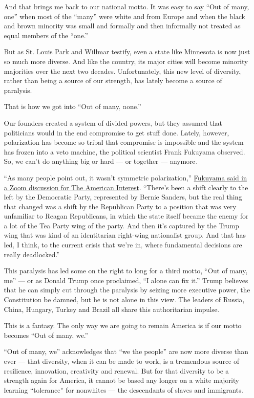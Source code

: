 And that brings me back to our national motto. It was easy to say ``Out
of many, one'' when most of the ``many'' were white and from Europe and
when the black and brown minority was small and formally and then
informally not treated as equal members of the ``one.''

But as St. Louis Park and Willmar testify, even a state like Minnesota
is now just so much more diverse. And like the country, its major cities
will become minority majorities over the next two decades.
Unfortunately, this new level of diversity, rather than being a source
of our strength, has lately become a source of paralysis.

That is how we got into ``Out of many, none.''

Our founders created a system of divided powers, but they assumed that
politicians would in the end compromise to get stuff done. Lately,
however, polarization has become so tribal that compromise is impossible
and the system has frozen into a veto machine, the political scientist
Frank Fukuyama observed. So, we can't do anything big or hard --- or
together --- anymore.

``As many people point out, it wasn't symmetric polarization,''
\href{https://www.the-american-interest.com/2020/05/13/political-decay-in-the-time-of-coronavirus/}{Fukuyama
said in a Zoom discussion for The American Interest}. ``There's been a
shift clearly to the left by the Democratic Party, represented by Bernie
Sanders, but the real thing that changed was a shift by the Republican
Party to a position that was very unfamiliar to Reagan Republicans, in
which the state itself became the enemy for a lot of the Tea Party wing
of the party. And then it's captured by the Trump wing that was kind of
an identitarian right-wing nationalist group. And that has led, I think,
to the current crisis that we're in, where fundamental decisions are
really deadlocked.''

This paralysis has led some on the right to long for a third motto,
``Out of many, me'' --- or as Donald Trump once proclaimed, ``I alone
can fix it.'' Trump believes that he can simply cut through the
paralysis by seizing more executive power, the Constitution be damned,
but he is not alone in this view. The leaders of Russia, China, Hungary,
Turkey and Brazil all share this authoritarian impulse.

This is a fantasy. The only way we are going to remain America is if our
motto becomes ``Out of many, we.''

``Out of many, we'' acknowledges that ``we the people'' are now more
diverse than ever --- that diversity, when it can be made to work, is a
tremendous source of resilience, innovation, creativity and renewal. But
for that diversity to be a strength again for America, it cannot be
based any longer on a white majority learning ``tolerance'' for
nonwhites --- the descendants of slaves and immigrants.

